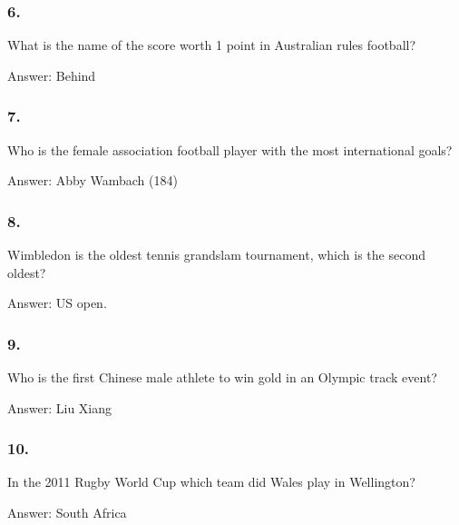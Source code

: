 \documentclass{beamer}
\begin{document}
    \begin{frame}
        \frametitle{6.}
        What is the name of the score worth 1 point in Australian rules
        football?\\

        \begin{center}
            Answer: Behind
        \end{center}
    \end{frame}

    \begin{frame}
        \frametitle{7.}
        Who is the female association football player with the most
        international goals?\\

        \begin{center}
            Answer: Abby Wambach (184)
        \end{center}
    \end{frame}

    \begin{frame}
        \frametitle{8.}
        Wimbledon is the oldest tennis grandslam tournament, which is the
        second oldest?\\

        \begin{center}
            Answer: US open.
        \end{center}
    \end{frame}

    \begin{frame}
        \frametitle{9.}
        Who is the first Chinese male athlete to win gold in an Olympic track
        event?\\

        \begin{center}
            Answer: Liu Xiang
        \end{center}
    \end{frame}

    \begin{frame}
        \frametitle{10.}
        In the 2011 Rugby World Cup which team did Wales play in Wellington?\\

        \begin{center}
            Answer: South Africa
        \end{center}
    \end{frame}
\end{document}
